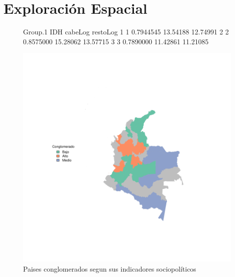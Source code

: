 \section{Exploración Espacial}\label{espacial}









\begin{figure}[h]
\begin{Schunk}
\begin{Soutput}
  Group.1       IDH  cabeLog restoLog
1       1 0.7944545 13.54188 12.74991
2       2 0.8575000 15.28062 13.57715
3       3 0.7890000 11.42861 11.21085
\end{Soutput}
\end{Schunk}
\includegraphics{espacial-plotMap1}
\caption{Paises conglomerados segun sus indicadores sociopolíticos}\label{clustmap}
\end{figure}


\endinput
